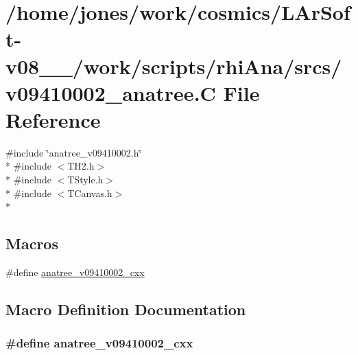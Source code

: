 \hypertarget{v09410002__anatree_8C}{\section{/home/jones/work/cosmics/\-L\-Ar\-Soft-\/v08\-\_\-\_/work/scripts/rhi\-Ana/srcs/v09410002\-\_\-anatree.C File Reference}
\label{v09410002__anatree_8C}
}
{\ttfamily \#include \char`\"{}anatree\-\_\-v09410002.\-h\char`\"{}}\\*
{\ttfamily \#include $<$T\-H2.\-h$>$}\\*
{\ttfamily \#include $<$T\-Style.\-h$>$}\\*
{\ttfamily \#include $<$T\-Canvas.\-h$>$}\\*
\subsection*{Macros}
\begin{DoxyCompactItemize}
\item 
\#define \hyperlink{v09410002__anatree_8C_a32cc3efd6e544d4dd5d479a8843e46dc}{anatree\-\_\-v09410002\-\_\-cxx}
\end{DoxyCompactItemize}


\subsection{Macro Definition Documentation}
\hypertarget{v09410002__anatree_8C_a32cc3efd6e544d4dd5d479a8843e46dc}{
\subsubsection[{anatree\-\_\-v09410002\-\_\-cxx}]{\setlength{\rightskip}{0pt plus 5cm}\#define anatree\-\_\-v09410002\-\_\-cxx}}\label{v09410002__anatree_8C_a32cc3efd6e544d4dd5d479a8843e46dc}
